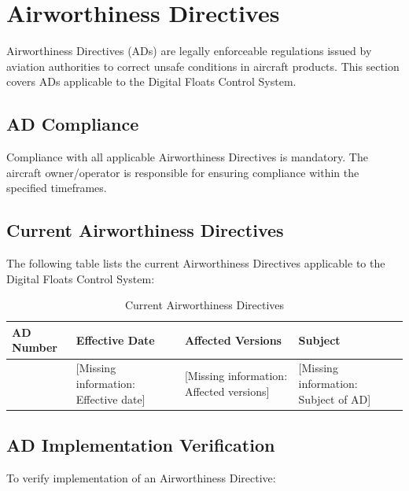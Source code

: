 \documentclass[12pt,a4paper,twoside,openright]{book}
\newcommand{\tabletextfont}{\normalfont\rmfamily}
\newcommand{\tableheadfont}{\normalfont\bfseries}
\begin{document}
\section{Airworthiness Directives}

Airworthiness Directives (ADs) are legally enforceable regulations issued by aviation authorities to correct unsafe conditions in aircraft products. This section covers ADs applicable to the Digital Floats Control System.

\subsection{AD Compliance}

Compliance with all applicable Airworthiness Directives is mandatory. The aircraft owner/operator is responsible for ensuring compliance within the specified timeframes.

\subsection{Current Airworthiness Directives}

The following table lists the current Airworthiness Directives applicable to the Digital Floats Control System:

\begin{table}[h]
\centering
\setlength{\tabcolsep}{5pt} %
\begin{tabular}{|p{}|p{}|p{}|p{}|}
\hline
\tableheadfont\textbf{AD Number} & \tableheadfont\textbf{Effective Date} & \tableheadfont\textbf{Affected Versions} & \tableheadfont\textbf{Subject} \\
\hline
\tabletextfont {\color{missingred}[Missing information: AD number if applicable]} & {\color{missingred}[Missing information: Effective date]} & {\color{missingred}[Missing information: Affected versions]} & {\color{missingred}[Missing information: Subject of AD]} \\
\hline
\end{tabular}
\caption{Current Airworthiness Directives}
\end{table}

\subsection{AD Implementation Verification}

To verify implementation of an Airworthiness Directive:
\end{document}
